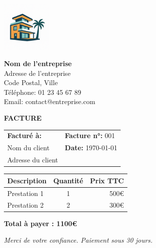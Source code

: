 \documentclass[12pt,a4paper]{article}
\begin{document}
\begin{minipage}{0.4\textwidth}
    \includegraphics[height=2.5cm]{assets/logo.png}
\end{minipage}
\hfill
\begin{minipage}{0.55\textwidth}
    \raggedleft
    {\Large \textbf{Nom de l'entreprise}}\\
    Adresse de l'entreprise\\
    Code Postal, Ville\\
    Téléphone: 01 23 45 67 89\\
    Email: contact@entreprise.com
\end{minipage}

\vspace{1cm}

{\LARGE \textbf{FACTURE}}

\vspace{0.5cm}

\begin{tabular}{ll}
\textbf{Facturé à:}        & \textbf{Facture n°:} 001 \\
Nom du client             & \textbf{Date:} \today \\
Adresse du client         & \\
\end{tabular}

\vspace{0.8cm}

\begin{tabular}{|l|c|r|}
\hline
\textbf{Description}   & \textbf{Quantité} & \textbf{Prix TTC} \\
\hline
Prestation 1           & 1                 & 500€ \\
Prestation 2           & 2                 & 300€ \\
\hline
\end{tabular}

\vspace{0.5cm}

\begin{flushright}
\textbf{Total à payer : 1100€}
\end{flushright}

\vspace{2cm}

\textit{Merci de votre confiance. Paiement sous 30 jours.}
\end{document}
